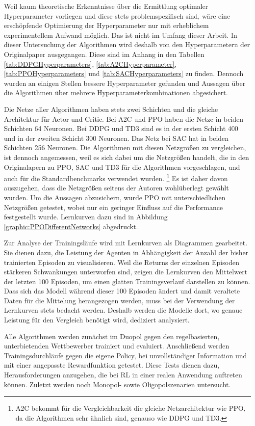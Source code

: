 Weil kaum theoretische Erkenntnisse über die Ermittlung optimaler Hyperparameter vorliegen und diese stets problemspezifisch sind, wäre eine erschöpfende Optimierung der Hyperparameter nur mit erheblichem experimentellem Aufwand möglich.
Das ist nicht im Umfang dieser Arbeit.
In dieser Untersuchung der Algorithmen wird deshalb von den Hyperparametern der Originalpaper ausgegangen.
Diese sind im Anhang in den Tabellen \ref{tab:DDPGHyperparameters}, \ref{tab:A2CHyperparameter}, \ref{tab:PPOHyperparameters} und \ref{tab:SACHyperparameters} zu finden.
Dennoch wurden an einigen Stellen bessere Hyperparameter gefunden und Aussagen über die Algorithmen über mehrere Hyperparameterkombinationen abgesichert.

Die Netze aller Algorithmen haben stets zwei Schichten und die gleiche Architektur für Actor und Critic.
Bei A2C und PPO haben die Netze in beiden Schichten 64 Neuronen.
Bei DDPG und TD3 sind es in der ersten Schicht 400 und in der zweiten Schicht 300 Neuronen.
Das Netz bei SAC hat in beiden Schichten 256 Neuronen.
Die Algorithmen mit diesen Netzgrößen zu vergleichen, ist dennoch angemessen, weil es sich dabei um die Netzgrößen handelt, die in den Originalapern zu PPO, SAC und TD3 für die Algorithmen vorgeschlagen, und auch für die Standardbenchmarks verwendet wurden. \footnote{A2C bekommt für die Vergleichbarkeit die gleiche Netzarchitektur wie PPO, da die Algorithmen sehr ähnlich sind, genauso wie DDPG und TD3.}
Es ist daher davon auszugehen, dass die Netzgrößen seitens der Autoren wohlüberlegt gewählt wurden.
Um die Aussagen abzusichern, wurde PPO mit unterschiedlichen Netzgrößen getestet, wobei nur ein geringer Einfluss auf die Performance festgestellt wurde.
Lernkurven dazu sind in Abbildung \ref{graphic:PPODifferentNetworks} abgedruckt.

Zur Analyse der Trainingsläufe wird mit Lernkurven als Diagrammen gearbeitet.
Sie dienen dazu, die Leistung der Agenten in Abhängigkeit der Anzahl der bisher trainierten Episoden zu visualisieren.
Weil die Returns der einzelnen Episoden stärkeren Schwankungen unterworfen sind, zeigen die Lernkurven den Mittelwert der letzten 100 Episoden, um einen glatten Trainingsverlauf darstellen zu können.
Dass sich das Modell während dieser 100 Episoden ändert und damit veraltete Daten für die Mittelung herangezogen werden, muss bei der Verwendung der Lernkurven stets bedacht werden.
Deshalb werden die Modelle dort, wo genaue Leistung für den Vergleich benötigt wird, dediziert analysiert.

Alle Algorithmen werden zunächst im Duopol gegen den regelbasierten, unterbietenden Wettbewerber trainiert und evaluiert.
Anschließend werden Trainingsdurchläufe gegen die eigene Policy, bei unvollständiger Information und mit einer angepasste Rewardfunktion getestet.
Diese Tests dienen dazu, Herausforderungen anzugehen, die bei RL in einer realen Anwendung auftreten können.
Zuletzt werden noch Monopol- sowie Oligopolszenarien untersucht.

